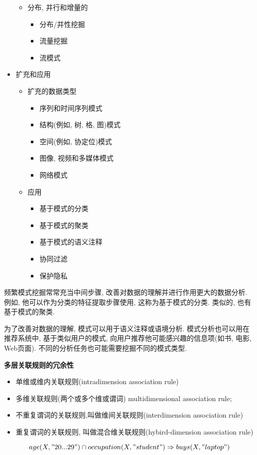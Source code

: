 \documentclass{article}
\begin{document}
\begin{itemize}
\begin{itemize}
\begin{itemize}
				\end{itemize}
			\item 分布, 并行和增量的
				\begin{itemize}
					\item 分布/并性挖掘
					\item 流量挖掘
					\item 流模式
				\end{itemize}
		\end{itemize}
	\item 扩充和应用
		\begin{itemize}
			\item 扩充的数据类型
				\begin{itemize}
					\item 序列和时间序列模式
					\item 结构(例如, 树, 格, 图)模式
					\item 空间(例如, 协定位)模式
					\item 图像, 视频和多媒体模式
					\item 网络模式
				\end{itemize}
			\item 应用
				\begin{itemize}
					\item 基于模式的分类
					\item 基于模式的聚类
					\item 基于模式的语义注释
					\item 协同过滤
					\item 保护隐私
				\end{itemize}
		\end{itemize}
\end{itemize}

频繁模式挖掘常常充当中间步骤, 改善对数据的理解并进行作用更大的数据分析. 例如, 他可以作为分类的特征提取步骤使用, 这称为基于模式的分类. 类似的, 也有基于模式的聚类.

为了改善对数据的理解, 模式可以用于语义注释或语境分析. 模式分析也可以用在推荐系统中, 基于类似用户的模式, 向用户推荐他可能感兴趣的信息项(如书, 电影, Web页面). 不同的分析任务也可能需要挖掘不同的模式类型.

\textbf{多层关联规则的冗余性}

\begin{itemize}
\item 单维或维内关联规则(intradimension association rule)
\item 多维关联规则(两个或多个维或谓词) multidimensional association rule;
\item 不重复谓词的关联规则,叫做维间关联规则(interdimension association rule)
\item 重复谓词的关联规则, 叫做混合维关联规则(hybird-dimension association rule)
\end{itemize}
$$
age(X,"20...29") \cap occupation(X,"student") \Rightarrow buys(X,"laptop")
$$
\end{document}
